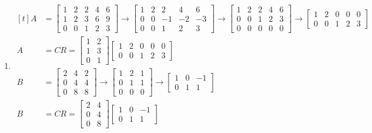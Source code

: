 \documentclass{article}
\begin{document}
\begin{enumerate}
	\item
		$\begin{aligned}[t]
			A&=\begin{bmatrix}
				1 & 2 & 2 & 4 & 6 \\
				1 & 2 & 3 & 6 & 9 \\
				0 & 0 & 1 & 2 & 3
			\end{bmatrix}\to
			\begin{bmatrix}
				1 & 2 & 2 & 4 & 6 \\
				0 & 0 & -1 & -2 & -3 \\
				0 & 0 & 1 & 2 & 3
			\end{bmatrix}\to
			\begin{bmatrix}
				1 & 2 & 2 & 4 & 6 \\
				0 & 0 & 1 & 2 & 3 \\
				0 & 0 & 0 & 0 & 0
			\end{bmatrix}\to
			\begin{bmatrix}
				1 & 2 & 0 & 0 & 0 \\
				0 & 0 & 1 & 2 & 3
			\end{bmatrix} \\
			A&=CR=\begin{bmatrix}
				1 & 2 \\
				1 & 3 \\
				0 & 1
			\end{bmatrix}
			\begin{bmatrix}
				1 & 2 & 0 & 0 & 0 \\
				0 & 0 & 1 & 2 & 3
			\end{bmatrix} \\
			B&=\begin{bmatrix}
				2 & 4 & 2 \\
				0 & 4 & 4 \\
				0 & 8 & 8
			\end{bmatrix}\to
			\begin{bmatrix}
				1 & 2 & 1 \\
				0 & 1 & 1 \\
				0 & 0 & 0
			\end{bmatrix}\to
			\begin{bmatrix}
				1 & 0 & -1 \\
				0 & 1 & 1
			\end{bmatrix} \\
			B&=CR=\begin{bmatrix}
				2 & 4 \\
				0 & 4 \\
				0 & 8
			\end{bmatrix}
			\begin{bmatrix}
				1 & 0 & -1 \\
				0 & 1 & 1
			\end{bmatrix}
		\end{aligned}$


\end{enumerate}
\end{document}
